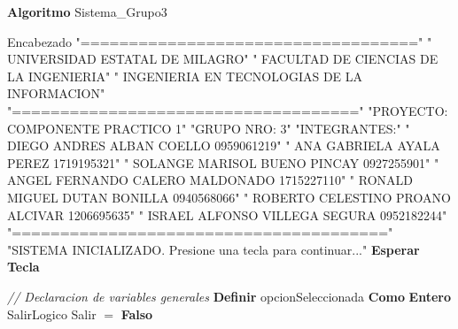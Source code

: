 \documentclass[12pt,a4paper]{article}
\newcommand{\kw}[1]{\textcolor{pseKeyword}{\textbf{#1}}}
\newcommand{\txt}[1]{\textcolor{pseString}{"#1"}}
\newcommand{\cmt}[1]{\textcolor{pseComment}{\textit{// #1}}}
\newcommand{\opAsig}{\textcolor{pseKeyword}{$=$}}
\newcommand{\Asignacion}[2]{#1\; \opAsig\; #2}
\newcommand{\Escribir}[1]{\kw{Escribir} #1}
\newcommand{\Definir}[2]{\kw{Definir} #1 \kw{Como} \kw{#2}}
\newcommand{\I}{\hspace{1.5em}}
\begin{document}
\begin{algorithmic}[1]
	
	\State \kw{Algoritmo} Sistema\_Grupo3
	
	\State \I \kw \cmt{Encabezado}
	\State \I \kw \Escribir{\txt{===================================}}
	\State \I \kw \Escribir{\txt{           UNIVERSIDAD ESTATAL DE MILAGRO}}
	\State \I \kw \Escribir{\txt{        FACULTAD DE CIENCIAS DE LA INGENIERIA}}
	\State \I \kw \Escribir{\txt{    INGENIERIA EN TECNOLOGIAS DE LA INFORMACION}}
	\State \I \kw \Escribir{\txt{====================================}}
	\State \I \kw \Escribir{\txt{PROYECTO: COMPONENTE PRACTICO 1}}
	\State \I \kw \Escribir{\txt{GRUPO NRO: 3}}
	\State \I \kw \Escribir{\txt{INTEGRANTES:}}
	\State \I \kw \Escribir{\txt{  DIEGO ANDRES ALBAN COELLO        0959061219}}
	\State \I \kw \Escribir{\txt{  ANA GABRIELA AYALA PEREZ         1719195321}}
	\State \I \kw \Escribir{\txt{  SOLANGE MARISOL BUENO PINCAY     0927255901}}
	\State \I \kw \Escribir{\txt{  ANGEL FERNANDO CALERO MALDONADO  1715227110}}
	\State \I \kw \Escribir{\txt{  RONALD MIGUEL DUTAN BONILLA      0940568066}}
	\State \I \kw \Escribir{\txt{  ROBERTO CELESTINO PROANO ALCIVAR 1206695635}}
	\State \I \kw \Escribir{\txt{  ISRAEL ALFONSO VILLEGA SEGURA    0952182244}}
	\State \I \kw \Escribir{\txt{=======================================}}
	\State \I \kw \Escribir{\txt{SISTEMA INICIALIZADO. Presione una tecla para continuar...}}
	\State \I \kw{Esperar Tecla}
	\State
	
	\State \I \cmt{Declaracion de variables generales}
	\State \I \Definir{opcionSeleccionada}{Entero}
	\State \I \kw \Definir{Salir}{Logico}
	\State \I \Asignacion{Salir}{\kw{Falso}}
	

\end{algorithmic}
\end{document}

